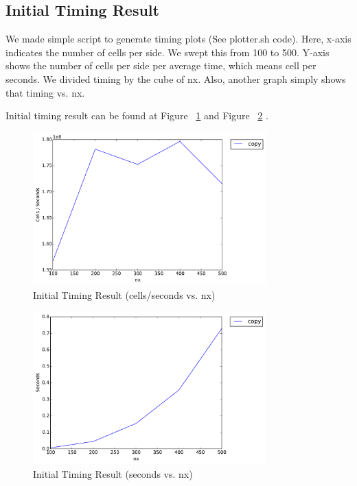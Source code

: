 \subsection{Initial Timing Result}
We made simple script to generate timing plots (See plotter.sh code). Here, x-axis indicates the number of cells per side. We swept this from 100 to 500. Y-axis shows the number of cells per side per average time, which means cell per seconds. We divided timing by the cube of nx. Also, another graph simply shows that timing vs. nx. 

Initial timing result can be found at Figure ~\ref{fig:initial_timing_result1} and Figure ~\ref{fig:initial_timing_result2} .

\begin{figure}[h]
    \centering
    \includegraphics[width=0.8\textwidth]{figs/init-timing1.pdf}
    \caption{Initial Timing Result (cells/seconds vs. nx)}
    \label{fig:initial_timing_result1}
\end{figure}

\begin{figure}[h]
    \centering
    \includegraphics[width=0.8\textwidth]{figs/init-timing2.pdf}
    \caption{Initial Timing Result (seconds vs. nx)}
    \label{fig:initial_timing_result2}
\end{figure}